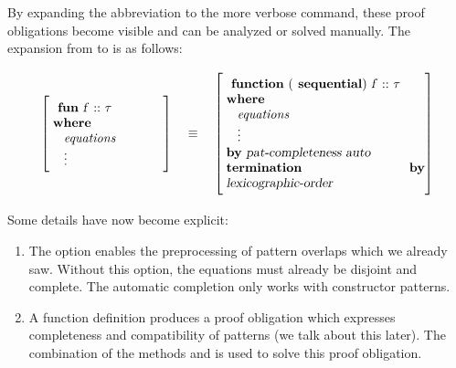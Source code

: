 \begin{isabellebody}
\begin{isamarkuptext}
  By expanding the abbreviation to the more verbose  command, these proof obligations become visible and can be analyzed or
  solved manually. The expansion from  to  is as follows:

\end{isamarkuptext}


\[\left[\;\begin{minipage}{0.25\textwidth}\vspace{6pt}
\cmd{fun} \isa{f\ {\isacharcolon}{\isacharcolon}\ {\isasymtau}}\\%
\cmd{where}\\%
\hspace*{2ex}{\it equations}\\%
\hspace*{2ex}\vdots\vspace*{6pt}
\end{minipage}\right]
\quad\equiv\quad
\left[\;\begin{minipage}{0.45\textwidth}\vspace{6pt}
\cmd{function} \isa{{\isacharparenleft}}\cmd{sequential}\isa{{\isacharparenright}\ f\ {\isacharcolon}{\isacharcolon}\ {\isasymtau}}\\%
\cmd{where}\\%
\hspace*{2ex}{\it equations}\\%
\hspace*{2ex}\vdots\\%
\cmd{by} \isa{pat{\isacharunderscore}completeness\ auto}\\%
\cmd{termination by} \isa{lexicographic{\isacharunderscore}order}\vspace{6pt}
\end{minipage}
\right]\]

\begin{isamarkuptext}
  \vspace*{1em}
  \noindent Some details have now become explicit:

  \begin{enumerate}
  \item The  option enables the preprocessing of
  pattern overlaps which we already saw. Without this option, the equations
  must already be disjoint and complete. The automatic completion only
  works with constructor patterns.

  \item A function definition produces a proof obligation which
  expresses completeness and compatibility of patterns (we talk about
  this later). The combination of the methods  and
   is used to solve this proof obligation.


\end{enumerate}
\end{isamarkuptext}
\end{isabellebody}
